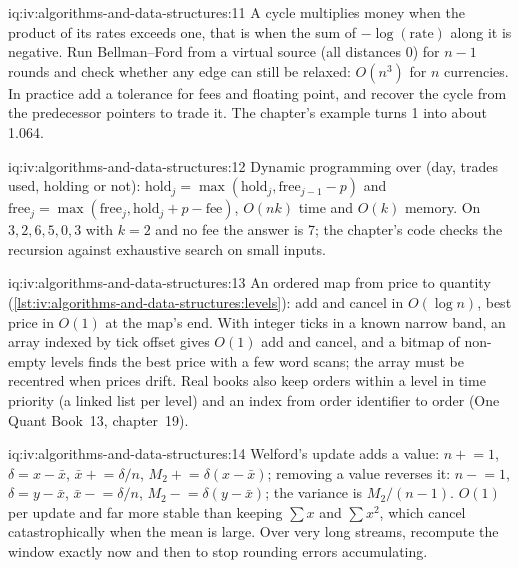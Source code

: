 \begin{solution}{iq:iv:algorithms-and-data-structures:11}
A cycle multiplies money when the product of its rates exceeds one, that is when the sum of $-\log(\text{rate})$ along it is
negative. Run Bellman--Ford from a virtual source (all distances 0) for $n - 1$ rounds and check whether any edge can still be
relaxed: $O(n^3)$ for $n$ currencies. In practice add a tolerance for fees and floating point, and recover the cycle from the
predecessor pointers to trade it. The chapter's example turns 1 into about 1.064.
\end{solution}

\begin{solution}{iq:iv:algorithms-and-data-structures:12}
Dynamic programming over (day, trades used, holding or not): $\text{hold}_j = \max(\text{hold}_j, \text{free}_{j-1} - p)$ and
$\text{free}_j = \max(\text{free}_j, \text{hold}_j + p - \text{fee})$, $O(nk)$ time and $O(k)$ memory. On $3, 2, 6, 5, 0, 3$
with $k = 2$ and no fee the answer is 7; the chapter's code checks the recursion against exhaustive search on small inputs.
\end{solution}

\begin{solution}{iq:iv:algorithms-and-data-structures:13}
An ordered map from price to quantity (\cref{lst:iv:algorithms-and-data-structures:levels}): add and cancel in $O(\log n)$,
best price in $O(1)$ at the map's end. With integer ticks in a known narrow band, an array indexed by tick offset gives $O(1)$
add and cancel, and a bitmap of non-empty levels finds the best price with a few word scans; the array must be recentred when
prices drift. Real books also keep orders within a level in time priority (a linked list per level) and an index from order
identifier to order (One Quant Book~13, chapter~19).
\end{solution}

\begin{solution}{iq:iv:algorithms-and-data-structures:14}
Welford's update adds a value: $n \mathrel{+}= 1$, $\delta = x - \bar x$, $\bar x \mathrel{+}= \delta/n$, $M_2 \mathrel{+}=
\delta(x - \bar x)$; removing a value reverses it: $n \mathrel{-}= 1$, $\delta = y - \bar x$, $\bar x \mathrel{-}= \delta/n$,
$M_2 \mathrel{-}= \delta(y - \bar x)$; the variance is $M_2/(n - 1)$. $O(1)$ per update and far more stable than keeping $\sum x$
and $\sum x^2$, which cancel catastrophically when the mean is large. Over very long streams, recompute the window exactly now and
then to stop rounding errors accumulating.
\end{solution}

